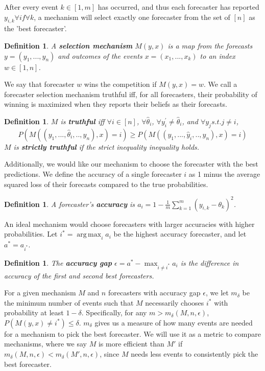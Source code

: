 \documentclass[letterpaper,12pt]{article}
\DeclareMathOperator*{\argmax}{arg\,max}
\newcommand{\1}{\mathbbm{1}}
\newtheorem{definition}[theorem]{Definition}
\begin{document}
After every event $k \in [1,m]$ has occurred, and thus each forecaster has reported $y_{i,k} \forall i f\forall k$, a mechanism will select exactly one forecaster from the set of $[n]$ as the 'best forecaster'.

\begin{definition}
  \label{mechanism}
  A \textbf{selection mechanism} $M(y, x)$ is a map from the forecasts $y = (y_1, ..., y_n)$ and outcomes of the events $x = (x_1, ..., x_k)$ to an index $w \in [1, n]$.
\end{definition}
We say that forecaster $w$ wins the competition if $M(y, x) = w$. We call a forecaster selection mechanism truthful iff, for all forecasters, their probability of winning is maximized when they reports their beliefs as their forecasts.

\begin{definition}
  \label{truthfullness}
  $M$ is \textbf{truthful} iff $\forall i \in [n]$, $\forall \hat{\theta}_i$, $\forall y^{\prime}_i \neq \hat{\theta}_i$, and $\forall y_j s.t. j \neq i$,
\[ P(M( (y_1, ..., \hat \theta_i, .., y_n), x ) = i) \geq  P(M( (y_1, ..., \hat y_i, .., y_n), x ) = i)\]
$M$ is \textbf{strictly truthful} if the strict inequality inequality holds.
\end{definition}

Additionally, we would like our mechanism to choose the forecaster with the best predictions. We define the accuracy of a single forecaster $i$ as 1 minus the average squared loss of their forecasts compared to the true probabilities.

\begin{definition}
  \label{accuracy}
  A forecaster's \textbf{accuracy} is $a_i = 1 - \frac{1}{m}\sum_{k=1}^m (y_{i, k} - \theta_k)^2$.
\end{definition}
An ideal mechanism would choose forecasters with larger accuracies with higher probabilities. Let $i^* = \argmax_i a_i$ be the highest accuracy forecaster, and let $a^* = a_{i^*}$.

\begin{definition}
  \label{accuracy_gap}
  The \textbf{accuracy gap} $\epsilon = a^* - \max_{i \neq i^*} a_i$ is the difference in accuracy of the first and second best forecasters.
\end{definition}

For a given mechanism $M$ and $n$ forecasters with accuracy gap $\epsilon$, we let $m_\delta$ be the minimum number of events such that $M$ necessarily chooses $i^*$ with probability at least $1 - \delta$. Specifically, for any $m > m_\delta(M, n, \epsilon)$, $P(M(y, x) \neq i^*) \leq \delta$. $m_\delta$ gives us a measure of how many events are needed for a mechanism to pick the best forecaster. We will use it as a metric to compare mechanisms, where we say $M$ is more efficient than $M'$ if $m_\delta(M, n, \epsilon) < m_\delta(M', n, \epsilon)$, since $M$ needs less events to consistently pick the best forecaster.
\end{document}

